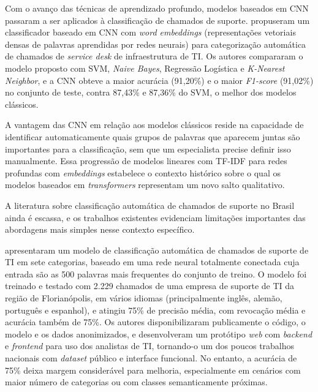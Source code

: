 \documentclass[
    12pt,                %
    openright,           %
    oneside,             %
    a4paper,             %
    english,             %
    brazil               %
]{abntex2}
\begin{document}
Com o avanço das técnicas de aprendizado profundo, modelos baseados em CNN passaram a ser aplicados à classificação de chamados de suporte.  propuseram um classificador baseado em CNN com \textit{word embeddings} (representações vetoriais densas de palavras aprendidas por redes neurais) para categorização automática de chamados de \textit{service desk} de infraestrutura de TI. Os autores compararam o modelo proposto com SVM, \textit{Naive Bayes}, Regressão Logística e \textit{K-Nearest Neighbor}, e a CNN obteve a maior acurácia (91,20\%) e o maior \textit{F1-score} (91,02\%) no conjunto de teste, contra 87,43\% e 87,36\% do SVM, o melhor dos modelos clássicos.

A vantagem das CNN em relação aos modelos clássicos reside na capacidade de identificar automaticamente quais grupos de palavras que aparecem juntas são importantes para a classificação, sem que um especialista precise definir isso manualmente. Essa progressão de modelos lineares com TF-IDF para redes profundas com \textit{embeddings} estabelece o contexto histórico sobre o qual os modelos baseados em \textit{transformers} representam um novo salto qualitativo.

\label{subsubsec:helpdesk_brasil}

A literatura sobre classificação automática de chamados de suporte no Brasil ainda é escassa, e os trabalhos existentes evidenciam limitações importantes das abordagens mais simples nesse contexto específico.

 apresentaram um modelo de classificação automática de chamados de suporte de TI em sete categorias, baseado em uma rede neural totalmente conectada cuja entrada são as 500 palavras mais frequentes do conjunto de treino. O modelo foi treinado e testado com 2.229 chamados de uma empresa de suporte de TI da região de Florianópolis, em vários idiomas (principalmente inglês, alemão, português e espanhol), e atingiu 75\% de precisão média, com revocação média e acurácia também de 75\%. Os autores disponibilizaram publicamente o código, o modelo e os dados anonimizados, e desenvolveram um protótipo \textit{web} com \textit{backend} e \textit{frontend} para uso dos analistas de TI, tornando-o um dos poucos trabalhos nacionais com \textit{dataset} público e interface funcional. No entanto, a acurácia de 75\% deixa margem considerável para melhoria, especialmente em cenários com maior número de categorias ou com classes semanticamente próximas.
\end{document}
